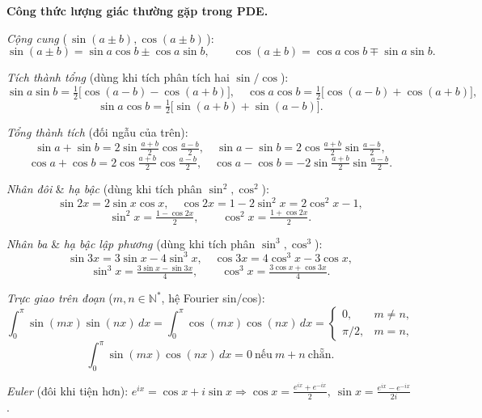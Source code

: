 \textbf{Công thức lượng giác thường gặp trong PDE.}

\emph{Cộng cung} (\,$\sin(a\pm b),\cos(a\pm b)$\,):
\[
  \sin(a\pm b)=\sin a\cos b\pm\cos a\sin b,\qquad
  \cos(a\pm b)=\cos a\cos b\mp\sin a\sin b.
\]

\emph{Tích thành tổng} (dùng khi tích phân tích hai $\sin/\cos$):
\[
  \sin a\sin b=\tfrac12\big[\cos(a-b)-\cos(a+b)\big],\quad
  \cos a\cos b=\tfrac12\big[\cos(a-b)+\cos(a+b)\big],
\]
\[
  \sin a\cos b=\tfrac12\big[\sin(a+b)+\sin(a-b)\big].
\]

\emph{Tổng thành tích} (đối ngẫu của trên):
\[
  \sin a+\sin b=2\sin\tfrac{a+b}{2}\cos\tfrac{a-b}{2},\quad
  \sin a-\sin b=2\cos\tfrac{a+b}{2}\sin\tfrac{a-b}{2},
\]
\[
  \cos a+\cos b=2\cos\tfrac{a+b}{2}\cos\tfrac{a-b}{2},\quad
  \cos a-\cos b=-2\sin\tfrac{a+b}{2}\sin\tfrac{a-b}{2}.
\]

\emph{Nhân đôi} \& \emph{hạ bậc} (dùng khi tích phân $\sin^2,\cos^2$):
\[
  \sin 2x=2\sin x\cos x,\quad \cos 2x=1-2\sin^2 x=2\cos^2 x-1,
\]
\[
  \sin^2 x=\tfrac{1-\cos 2x}{2},\qquad \cos^2 x=\tfrac{1+\cos 2x}{2}.
\]

\emph{Nhân ba} \& \emph{hạ bậc lập phương} (dùng khi tích phân $\sin^3,\cos^3$):
\[
  \sin 3x=3\sin x-4\sin^3 x,\quad \cos 3x=4\cos^3 x-3\cos x,
\]
\[
  \sin^3 x=\tfrac{3\sin x-\sin 3x}{4},\qquad \cos^3 x=\tfrac{3\cos x+\cos 3x}{4}.
\]

\emph{Trực giao trên đoạn} ($m,n\in\mathbb{N}^*$, hệ Fourier sin/cos):
\[
  \int_0^\pi \sin(mx)\sin(nx)\,dx=\int_0^\pi \cos(mx)\cos(nx)\,dx=\begin{cases}0,&m\ne n,\\ \pi/2,&m=n,\end{cases}
\]
\[
  \int_0^\pi \sin(mx)\cos(nx)\,dx=0\ \text{nếu}\ m+n\ \text{chẵn}.
\]

\emph{Euler} (đôi khi tiện hơn): $e^{ix}=\cos x+i\sin x \Rightarrow \cos x=\tfrac{e^{ix}+e^{-ix}}{2},\ \sin x=\tfrac{e^{ix}-e^{-ix}}{2i}$.
